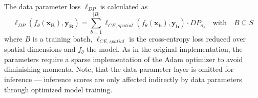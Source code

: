         The data parameter loss \(\ell_{DP}\) is calculated as
        \begin{equation}
            \label{eq:dp_loss}
            \ell_{DP}\left(f_\theta\left(\mathbf{x_B}\right), \mathbf{y_B}\right)
            = \sum_{b=1}^{\lvert B \rvert}\ell_{CE, spatial}\left(f_{\theta}\left(\mathbf{x_b}\right), \mathbf{y_b}\right) \cdot DP_{\sigma_{b}} \quad\textrm{with} \quad B \subseteq S
        \end{equation}
        where \(B\) is a training batch, \(\ell_{CE, spatial}\) is the cross-entropy loss reduced over spatial dimensions and \(f_\theta\) the model.
        As in the original implementation, the parameters require a sparse implementation of the Adam optimizer to avoid diminishing momenta.
        Note, that the data parameter layer is omitted for inference --- inference scores are only affected indirectly by data parameters through optimized model training.

